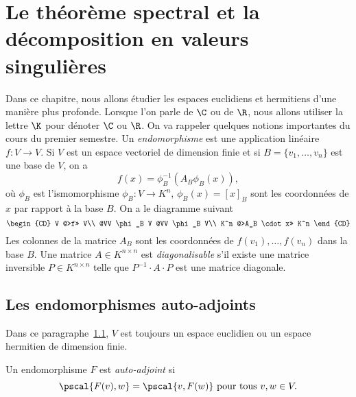 \chapter{Le théorème spectral et la décomposition en valeurs singulières}

\label{cha:appl-auto-adjo}

Dans ce chapitre, nous allons étudier les espaces euclidiens et hermitiens d'une manière plus profonde. Lorsque l'on parle de $\C$ ou de $\R$, nous allons utiliser la lettre $\K$ pour dénoter $\C$ ou $\R$. On va rappeler quelques notions importantes du cours du premier semestre. Un \emph{endomorphisme}  est une application linéaire $f \colon V \longrightarrow V$. Si $V$ est un espace vectoriel de dimension finie et si $B = \{v_1,\dots,v_n\}$ est une base de $V$, on a 
\begin{displaymath}
  f(x) = \phi_B^{-1} (A_B \phi_B(x)),
\end{displaymath}
où $\phi_B$ est l'ismomorphisme $\phi_B \colon V \longrightarrow K^n$, $\phi_B(x) = [x]_B$ sont les coordonnées de $x$ par rapport à la base $B$. On a le diagramme suivant 
\begin{displaymath}
  {
  \begin{CD}
    V     @>f>>  V\\
    @VV \phi_B V        @VV \phi_B V\\ 
    K^n     @>A_B \cdot x>>  K^n
  \end{CD}} 
\end{displaymath} 
Les colonnes de la matrice $A_B$ sont les coordonnées de $f(v_1),\dots,f(v_n)$ dans la base $B$. 
Une matrice $A \in K^{n \times n}$ est \emph{diagonalisable} s'il existe une matrice inversible $P \in K^{n \times n}$ telle que $P^{-1}\cdot A \cdot P$ est une matrice diagonale. 

\section{Les endomorphismes auto-adjoints} 
\label{sec:les-endom-auto}
\begin{framed}\noindent 
  Dans ce paragraphe~\ref{sec:les-endom-auto},  $V$
  est toujours un espace euclidien ou un espace hermitien de dimension finie. 
\end{framed}

\begin{definition}
\label{def:19}
Un endomorphisme $F$ est \emph{auto-adjoint} si 
\begin{displaymath}
  \pscal{F(v),w} = \pscal{v,F(w)} \text{ pour tous } v,w \in V. 
\end{displaymath}
\end{definition}

